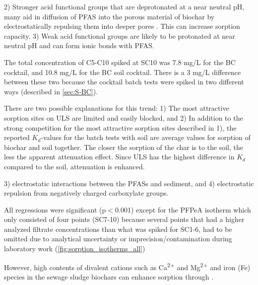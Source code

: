2) Stronger acid functional groups that are deprotonated at a near neutral pH, many aid in diffusion of PFAS into the porous material of biochar by electrostatically repulsing them into deeper pores \citep{du2014adsorption}. This can increase sorption capacity. 3) Weak acid functional groups are likely to be protonated at near neutral pH and can form ionic bonds with PFAS. 

The total concentration of C5-C10 spiked at SC10 was 7.8 mg/L for the BC cocktail, and 10.8 mg/L for the BC soil cocktail. There is a 3 mg/L difference between these two because the cocktail batch tests were spiked in two different ways (described in \cref{sec:S-BC}). 

There are two possible explanations for this trend: 1) The most attractive sorption sites on ULS are limited and easily blocked, and 2) In addition to the strong competition for the most attractive sorption sites described in 1), the reported $K_d$-values for the batch tests with soil are average values for sorption of biochar and soil together. The closer the sorption of the char is to the soil, the less the apparent attenuation effect. Since ULS has the highest difference in $K_d$ compared to the soil, attenuation is enhanced.

3) electrostatic interactions between the PFASs and sediment, and 4) electrostatic repulsion from negatively charged carboxylate groups.

All regressions were significant (p$<$0.001) except for the PFPeA isotherm which only consisted of four points (SC7-10) because several points that had a higher analyzed filtrate concentrations than what was spiked for SC1-6, had to be omitted due to analytical uncertainty or imprecision/contamination during laboratory work (\cref{fig:sorption_isotherms_all})

However, high contents of divalent cations such as Ca\textsuperscript{2+} and Mg\textsuperscript{2+} and iron (Fe) species in the sewage sludge biochars can enhance sorption through .

